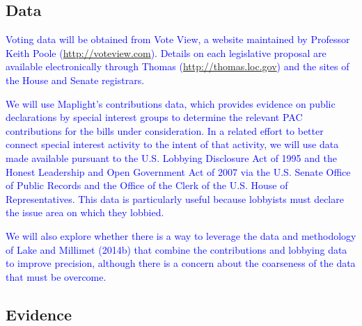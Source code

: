 \documentclass[12pt]{article}
\begin{document}
\subsection{Data}
\textcolor{blue}{Voting data will be obtained from Vote View, a website maintained by Professor Keith Poole (\url{http://voteview.com}). Details on each legislative proposal are available electronically through Thomas (\url{http://thomas.loc.gov}) and the sites of the House and Senate registrars.}

\textcolor{blue}{We will use Maplight's contributions data, which provides evidence on public declarations by special interest groups to determine the relevant PAC contributions for the bills under consideration. In a related effort to better connect special interest activity to the intent of that activity, we will use data made available pursuant to the U.S. Lobbying Disclosure Act of 1995 and the Honest Leadership and Open Government Act of 2007 via the U.S. Senate Office of Public Records and the Office of the Clerk of the U.S. House of Representatives. This data is particularly useful because lobbyists must declare the issue area on which they lobbied.}

\textcolor{blue}{We will also explore whether there is a way to leverage the data and methodology of Lake and Millimet (2014b) that combine the contributions and lobbying data to improve precision, although there is a concern about the coarseness of the data that must be overcome.}

\subsection{Evidence}
\end{document}
